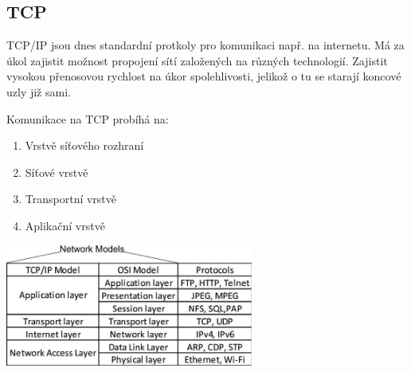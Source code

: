   \subsection{TCP}
    TCP/IP jsou dnes standardní protkoly pro komunikaci např. na internetu.
    Má za úkol zajistit možnost propojení sítí založených na různých technologií.
    Zajistit vysokou přenosovou rychlost na úkor spolehlivosti, jelikož o tu se starají koncové uzly již sami.
    \begin{multicols}{2}
      Komunikace na TCP probíhá na:
      \begin{enumerate}
        \item Vrstvě síťového rozhraní
        \item Síťové vrstvě
        \item Transportní vrstvě
        \item Aplikační vrstvě
      \end{enumerate}
      \columnbreak
      \includegraphics[height=4cm]{TVY-POS/ISO-OSI-TCP-IP/tcpip.jpg}
    \end{multicols}

